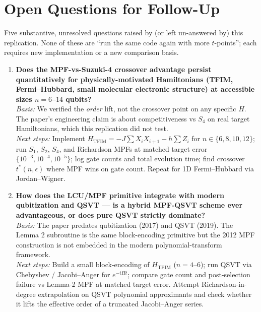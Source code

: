 \section{Open Questions for Follow-Up}

Five substantive, unresolved questions raised by (or left un-answered by) this
replication. None of these are ``run the same code again with more $t$-points'';
each requires new implementation or a new comparison basis.

\begin{enumerate}
  \item \textbf{Does the MPF-vs-Suzuki-4 crossover advantage persist quantitatively for
        physically-motivated Hamiltonians (TFIM, Fermi--Hubbard, small molecular electronic
        structure) at accessible sizes $n = 6$--$14$ qubits?}
        \\ \emph{Basis:} We verified the \emph{order} lift, not the crossover point on any
        specific $H$. The paper's engineering claim is about competitiveness vs $S_4$ on real
        target Hamiltonians, which this replication did not test.
        \\ \emph{Next steps:} Implement $H_{\text{TFIM}} = -J\sum X_iX_{i+1} - h\sum Z_i$ for
        $n \in \{6,8,10,12\}$; run $S_1$, $S_2$, $S_4$, and Richardson MPFs at matched target
        error $\{10^{-3}, 10^{-4}, 10^{-5}\}$; log gate counts and total evolution time; find
        crossover $t^*(n, \epsilon)$ where MPF wins on gate count. Repeat for 1D
        Fermi--Hubbard via Jordan--Wigner.

  \item \textbf{How does the LCU/MPF primitive integrate with modern qubitization and QSVT ---
        is a hybrid MPF-QSVT scheme ever advantageous, or does pure QSVT strictly dominate?}
        \\ \emph{Basis:} The paper predates qubitization (2017) and QSVT (2019). The Lemma 2
        subroutine is the same block-encoding primitive but the 2012 MPF construction is not
        embedded in the modern polynomial-transform framework.
        \\ \emph{Next steps:} Build a small block-encoding of $H_{\text{TFIM}}$ ($n=4$--$6$);
        run QSVT via Chebyshev / Jacobi--Anger for $e^{-iHt}$; compare gate count and
        post-selection failure vs Lemma-2 MPF at matched target error. Attempt Richardson-in-
        degree extrapolation on QSVT polynomial approximants and check whether it lifts the
        effective order of a truncated Jacobi--Anger series.


\end{enumerate}
